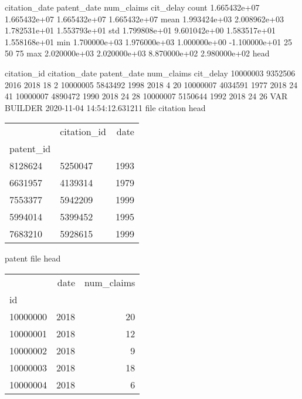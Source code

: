       citation_date   patent_date    num_claims     cit_delay
count   1.665432e+07  1.665432e+07  1.665432e+07  1.665432e+07
mean    1.993424e+03  2.008962e+03  1.782531e+01  1.553793e+01
std     1.799808e+01  9.601042e+00  1.583517e+01  1.558168e+01
min     1.700000e+03  1.976000e+03  1.000000e+00 -1.100000e+01
25%
50%
75%
max     2.020000e+03  2.020000e+03  8.870000e+02  2.980000e+02
head

         citation_id  citation_date  patent_date  num_claims  cit_delay
10000003     9352506           2016         2018          18          2
10000005     5843492           1998         2018           4         20
10000007     4034591           1977         2018          24         41
10000007     4890472           1990         2018          24         28
10000007     5150644           1992         2018          24         26
VAR BUILDER
2020-11-04 14:54:12.631211
file citation head 

\begin{tabular}{llr}
\toprule
{} & citation\_id &  date \\
patent\_id &             &       \\
\midrule
8128624   &     5250047 &  1993 \\
6631957   &     4139314 &  1979 \\
7553377   &     5942209 &  1999 \\
5994014   &     5399452 &  1995 \\
7683210   &     5928615 &  1999 \\
\bottomrule
\end{tabular}

patent file head 

\begin{tabular}{lrr}
\toprule
{} &  date &  num\_claims \\
id       &       &             \\
\midrule
10000000 &  2018 &          20 \\
10000001 &  2018 &          12 \\
10000002 &  2018 &           9 \\
10000003 &  2018 &          18 \\
10000004 &  2018 &           6 \\
\bottomrule
\end{tabular}

